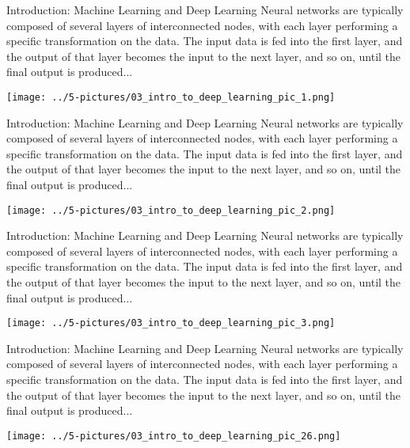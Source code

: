 \documentclass[11pt]{beamer}
\begin{document}
\begin{frame}{Introduction: Machine Learning and Deep Learning}
\footnotesize{
	Neural networks are typically composed of several layers of interconnected nodes, with each layer performing a specific transformation on the data. The input data is fed into the first layer, and the output of that layer becomes the input to the next layer, and so on, until the final output is produced...}
	\begin{center}
	\texttt{[image: ../5-pictures/03\_intro\_to\_deep\_learning\_pic\_1.png]}
	\end{center}
\end{frame}
\begin{frame}{Introduction: Machine Learning and Deep Learning}
\footnotesize{
	Neural networks are typically composed of several layers of interconnected nodes, with each layer performing a specific transformation on the data. The input data is fed into the first layer, and the output of that layer becomes the input to the next layer, and so on, until the final output is produced...}
	\begin{center}
	\texttt{[image: ../5-pictures/03\_intro\_to\_deep\_learning\_pic\_2.png]}
	\end{center}
\end{frame}
\begin{frame}{Introduction: Machine Learning and Deep Learning}
\footnotesize{
	Neural networks are typically composed of several layers of interconnected nodes, with each layer performing a specific transformation on the data. The input data is fed into the first layer, and the output of that layer becomes the input to the next layer, and so on, until the final output is produced...}
	\begin{center}
	\texttt{[image: ../5-pictures/03\_intro\_to\_deep\_learning\_pic\_3.png]}
	\end{center}
\end{frame}
\begin{frame}{Introduction: Machine Learning and Deep Learning}
\footnotesize{
	Neural networks are typically composed of several layers of interconnected nodes, with each layer performing a specific transformation on the data. The input data is fed into the first layer, and the output of that layer becomes the input to the next layer, and so on, until the final output is produced...}
	\begin{center}
	\texttt{[image: ../5-pictures/03\_intro\_to\_deep\_learning\_pic\_26.png]}
	\end{center}
\end{frame}
\end{document}

